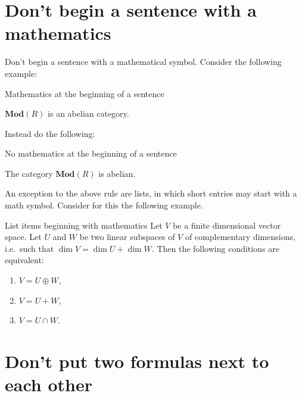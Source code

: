 \section{Don’t begin a sentence with a mathematics}

Don’t begin a sentence with a mathematical symbol.
Consider the following example:
\begin{showlatex}{Mathematics at the beginning of a sentence}
\begin{theorem}
  $\mathbf{Mod}(R)$ is an abelian category.
\end{theorem}
\end{showlatex}
Instead do the following:
\begin{showlatex}{No mathematics at the beginning of a sentence}
\begin{theorem}
  The category $\mathbf{Mod}(R)$ is abelian.
\end{theorem}
\end{showlatex}

An exception to the above rule are lists, in which short entries may start with a math symbol.
Consider for this the following example.
\begin{showlatex}{List items beginning with mathematics}
Let $V$ be a finite dimensional vector space.
Let $U$ and $W$ be two linear subspaces of $V$ of complementary dimensions, i.e.\ such that $\dim V = \dim U + \dim W$.
Then the following conditions are equivalent:
\begin{enumerate}[label = \roman*)]
  \item
    $V = U \oplus W$,
  \item
    $V = U + W$,
  \item
    $V = U \cap W$.
\end{enumerate}
\end{showlatex}





\section{Don’t put two formulas next to each other}

